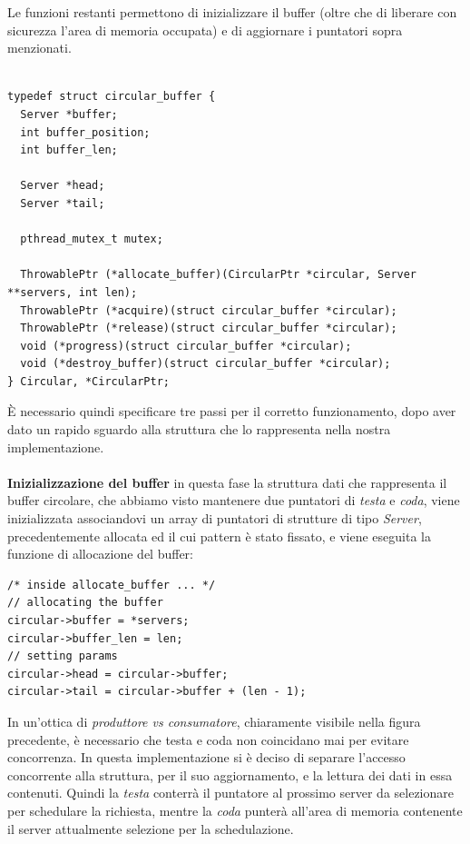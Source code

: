 \documentclass[italian]{tktltiki2}
\begin{document}
	Le funzioni restanti permettono di inizializzare il buffer (oltre che di liberare con sicurezza l'area di memoria occupata) e di aggiornare i puntatori sopra menzionati.\\\\
\begin{lstlisting}
typedef struct circular_buffer {
  Server *buffer;
  int buffer_position;
  int buffer_len;
  
  Server *head;
  Server *tail;

  pthread_mutex_t mutex;

  ThrowablePtr (*allocate_buffer)(CircularPtr *circular, Server **servers, int len);
  ThrowablePtr (*acquire)(struct circular_buffer *circular);
  ThrowablePtr (*release)(struct circular_buffer *circular);
  void (*progress)(struct circular_buffer *circular);
  void (*destroy_buffer)(struct circular_buffer *circular);
} Circular, *CircularPtr;
\end{lstlisting}
È necessario quindi specificare tre passi per il corretto funzionamento, dopo aver dato un rapido sguardo alla struttura che lo rappresenta nella nostra implementazione. 
\\
\\
\textbf{Inizializzazione del buffer} in questa fase la struttura dati che rappresenta il buffer circolare, che abbiamo visto mantenere due puntatori di \emph{testa} e \emph{coda}, viene inizializzata associandovi un array di puntatori di strutture di tipo \emph{Server}, precedentemente allocata ed il cui pattern è stato fissato, e viene eseguita la funzione di allocazione del buffer: 
\begin{lstlisting}
/* inside allocate_buffer ... */
// allocating the buffer
circular->buffer = *servers;
circular->buffer_len = len;
// setting params
circular->head = circular->buffer;
circular->tail = circular->buffer + (len - 1);
\end{lstlisting}
In un'ottica di \emph{produttore vs consumatore}, chiaramente visibile nella figura precedente, è necessario che testa e coda non coincidano mai per evitare concorrenza. In questa implementazione si è deciso di separare l'accesso concorrente alla struttura, per il suo aggiornamento, e la lettura dei dati in essa contenuti. Quindi la \emph{testa} conterrà il puntatore al prossimo server da selezionare per schedulare la richiesta, mentre la \emph{coda} punterà all'area di memoria contenente il server attualmente selezione per la schedulazione. 
\\
\\
\end{document}
